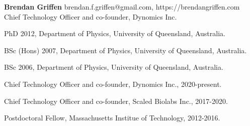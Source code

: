 \documentclass[12pt,letterpaper]{article}
\begin{document}
\thispagestyle{empty}\sloppy\sloppypar\raggedbottom

\textbf{\Large Brendan Griffen} \hfill
\textsf{\small brendan.f.griffen@gmail.com, https://brendangriffen.com} \\[0.5ex]
Chief Technology Officer and co-founder, Dynomics Inc.\\[0.5ex]

\begin{list}{}{\cvlist}
  \item
        PhD 2012,  Department of Physics, University of Queensland, Australia.
  \item
        BSc (Hons) 2007, Department of Physics, University of Queensland, Australia.
  \item
        BSc 2006, Department of Physics, University of Queensland, Australia.
\end{list}


\begin{list}{}{\cvlist}
  \item
        Chief Technology Officer and co-founder, Dynomics Inc., 2020-present.
  \item
        Chief Technology Officer and co-founder, Scaled Biolabs Inc., 2017-2020.
  \item
        Postdoctoral Fellow, Massachusetts Institue of Technology, 2012-2016.
\end{list}


\ifdefined\withpubs
  

  \begin{list}{}{\cvlist}
    
  \end{list}

\fi
\end{document}
